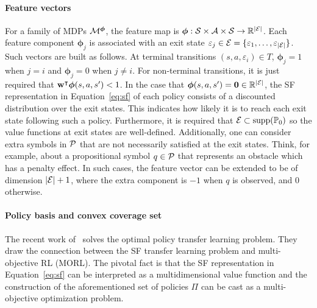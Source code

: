 \paragraph{Feature vectors} For a family of MDPs $\mathcal{M}^{\boldsymbol{\phi}}$, the feature map is ${\boldsymbol{\phi}}:\mathcal{S}\times\mathcal{A}\times\mathcal{S}\rightarrow\mathbb{R}^{\lvert\mathcal{E}\rvert}$. Each feature component $\boldsymbol\phi_j$ is associated with an exit state $\varepsilon_j\in\mathcal{E}=\{\varepsilon_1,\ldots,\varepsilon_{\lvert\mathcal{E}\rvert}\}$. Such vectors are built as follows. At terminal transitions $(s, a, \varepsilon_i)\in T$, $\boldsymbol\phi_{j} = 1$ when $j=i$ and $\boldsymbol\phi_{j}=0$ when $j\neq i$. For non-terminal transitions, it is just required that $\mathbf{w}^\intercal\boldsymbol\phi(s, a, s')<1$. In the case that ${\boldsymbol\phi(s, a, s')=\mathbf{0}\in\mathbb{R}^{\lvert\mathcal{E}\rvert}}$, the SF representation in Equation~\eqref{eq:sf} of each policy consists of a discounted distribution over the exit states. This indicates how likely it is to reach each exit state following such a policy. Furthermore, it is required that $\mathcal{E}\subset\text{supp}(\mathbb{P}_0)$ so the value functions at exit states are well-defined. Additionally, one can consider extra symbols in $\mathcal{P}$ that are not necessarily satisfied at the exit states. Think, for example, about a propositional symbol $q\in\mathcal{P}$ that represents an obstacle which has a penalty effect. In such cases, the feature vector can be extended to be of dimension $\lvert\mathcal{E}\rvert + 1$, where the extra component is $-1$ when $q$ is observed, and $0$ otherwise. 

\paragraph{Policy basis and convex coverage set} The recent work of~\citep{Alegre2022} solves the optimal policy transfer learning problem. They draw the connection between the SF transfer learning problem and multi-objective RL (MORL). The pivotal fact is that the SF representation in Equation~\eqref{eq:sf} can be interpreted as a multidimensional value function and the construction of the aforementioned set of policies $\Pi$ can be cast as a multi-objective optimization problem.
 
